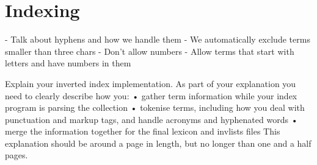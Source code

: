
\section{Indexing}
\label{sec:indexing}

- Talk about hyphens and how we handle them
- We automatically exclude terms smaller than three chars
- Don't allow numbers
- Allow terms that start with letters and have numbers in them


Explain your inverted index implementation. As part of your explanation you need to clearly describe how you:
• gather term information while your index program is parsing the collection
• tokenise terms, including how you deal with punctuation and markup tags, and
handle acronyms and hyphenated words
• merge the information together for the final lexicon and invlists files
This explanation should be around a page in length, but no longer than one and a half pages.


